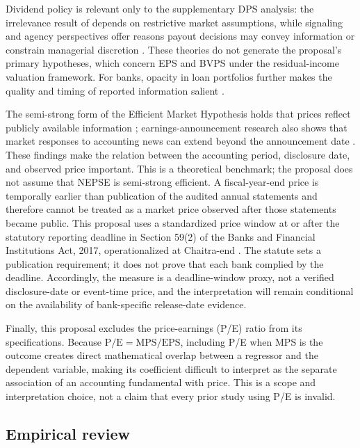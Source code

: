 \begin{sloppypar}
Dividend policy is relevant only to the supplementary DPS analysis: the irrelevance result of \citet{miller1961} depends on restrictive market assumptions, while signaling and agency perspectives offer reasons payout decisions may convey information or constrain managerial discretion \citep{ross1977,bhattacharya1979,jensen1986}. These theories do not generate the proposal's primary hypotheses, which concern EPS and BVPS under the residual-income valuation framework. For banks, opacity in loan portfolios further makes the quality and timing of reported information salient \citep{morgan2002}.
\end{sloppypar}

The semi-strong form of the Efficient Market Hypothesis holds that prices reflect publicly available information \citep{fama1970}; earnings-announcement research also shows that market responses to accounting news can extend beyond the announcement date \citep{ball1968,beaver1968,bernard1989}. These findings make the relation between the accounting period, disclosure date, and observed price important. This is a theoretical benchmark; the proposal does not assume that NEPSE is semi-strong efficient. A fiscal-year-end price is temporally earlier than publication of the audited annual statements and therefore cannot be treated as a market price observed after those statements became public. This proposal uses a standardized price window at or after the statutory reporting deadline in Section 59(2) of the Banks and Financial Institutions Act, 2017, operationalized at Chaitra-end \citep{bafia2017}. The statute sets a publication requirement; it does not prove that each bank complied by the deadline. Accordingly, the measure is a deadline-window proxy, not a verified disclosure-date or event-time price, and the interpretation will remain conditional on the availability of bank-specific release-date evidence.

Finally, this proposal excludes the price-earnings (P/E) ratio from its specifications. Because $\text{P/E} = \text{MPS}/\text{EPS}$, including P/E when MPS is the outcome creates direct mathematical overlap between a regressor and the dependent variable, making its coefficient difficult to interpret as the separate association of an accounting fundamental with price. This is a scope and interpretation choice, not a claim that every prior study using P/E is invalid.

\subsection{Empirical review}


